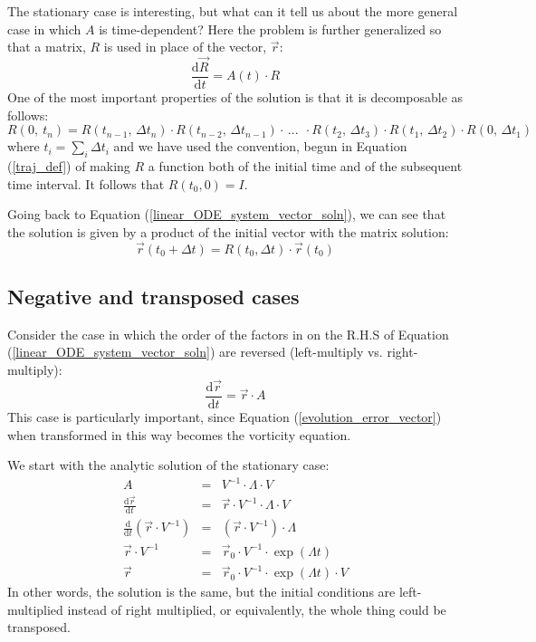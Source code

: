 \documentclass[12pt]{article}
\begin{document}
The stationary case is interesting, but what can it tell us about the 
more general case in which $A$ is time-dependent?
Here the problem is further generalized so that a matrix, $R$ 
is used in place of the vector, $\vec r$:
\begin{equation}
\frac{\mathrm d \vec R}{\mathrm d t}=A(t) \cdot R
\label{linear_ODE_system_matrix_soln}
\end{equation}
One of the most important properties of the solution is that it
is decomposable as follows:
\begin{equation}
R(0,~t_n) = R(t_{n-1},\,\Delta t_n) \cdot R(t_{n-2},\,\Delta t_{n-1}) \cdot \, ...~~ \cdot R(t_2,\, \Delta t_3) \cdot R(t_1,\,\Delta t_2) \cdot R(0,\,\Delta t_1)
\label{matrix_soln_decomposition}
\end{equation}
where $t_i=\sum_i \Delta t_i$ and we have used the convention, begun
in Equation (\ref{traj_def}) of making $R$ a function both of the
initial time and of the subsequent time interval.  It follows that $R(t_0, 0)=I$.

Going back to Equation (\ref{linear_ODE_system_vector_soln}), we can
see that the solution is given by a product of the initial vector with
the matrix solution:
\begin{equation}
\vec r(t_0+\Delta t)=R(t_0, \Delta t) \cdot \vec r(t_0)
\end{equation}

\subsection{Negative and transposed cases}

Consider the case in which the order of the factors in on the R.H.S of Equation 
(\ref{linear_ODE_system_vector_soln}) are reversed (left-multiply vs. right-multiply):
\begin{equation}
\frac{\mathrm d \vec r}{\mathrm d t} = \vec r \cdot A
\end{equation}
This case is particularly important, since Equation (\ref{evolution_error_vector})
when transformed in this way becomes the vorticity equation.

We start with the analytic solution of the stationary case:
\begin{eqnarray}
A & = & V^{-1} \cdot \Lambda \cdot V \\
\frac{\mathrm d \vec r}{\mathrm d t} & = & \vec r \cdot V^{-1} \cdot \Lambda \cdot V \\
\frac{\mathrm d}{\mathrm d t} (\vec r \cdot V^{-1}) & = & (\vec r \cdot V^{-1}) \cdot \Lambda \\
\vec r \cdot V^{-1} & = & \vec r_0 \cdot V^{-1} \cdot \exp (\Lambda t) \\
\vec r & = & \vec r_0 \cdot V^{-1} \cdot \exp (\Lambda t) \cdot V 
\end{eqnarray}
In other words, the solution is the same, but the initial conditions are
left-multiplied instead of right multiplied, or equivalently, the whole thing 
could be transposed.
\end{document}
